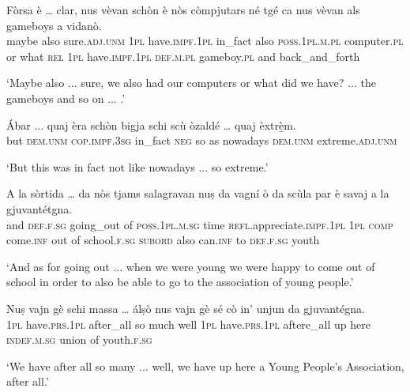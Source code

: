 \begin{linenumbers}
	\gll Fòrsa è … clar, nus vèvan schòn è nòs còmpjutars né tgé ca nus vèvan als gameboys a vidanò.    \\
	maybe also {} sure.\textsc{adj.unm} \textsc{1pl} have.\textsc{impf.1pl} in\_fact also \textsc{poss.1pl.m.pl} computer.\textsc{pl} or what \textsc{rel} \textsc{1pl} have.\textsc{impf.1pl} \textsc{def.m.pl} gameboy.\textsc{pl} and back\_and\_forth \\
\end{linenumbers}
\medskip
\glt `Maybe also ... sure, we also had our computers or what did we have? ... the gameboys and so on ... .'
\medskip

\begin{linenumbers}
	\gll  Ábar ... quaj èra schòn bigja schi scù òzaldé … quaj èxtrè̱m.   \\
	but {} \textsc{dem.unm} \textsc{cop.impf.3sg} in\_fact \textsc{neg} so as nowadays {} \textsc{dem.unm} extreme.\textsc{adj.unm}\\
\end{linenumbers}
\medskip
\glt `But this was in fact not like nowadays ... so extreme.'
\medskip

\begin{linenumbers}
	\gll A la sòrtida … da nòs tjams salagravan nuṣ da vagní ò da scùla par è savaj a la gjuvantétgna.\\
	and \textsc{def.f.sg} going\_out {} of \textsc{ poss.1pl.m.sg} time \textsc{refl}.appreciate.\textsc{impf.1pl} \textsc{1pl} \textsc{comp} come.\textsc{inf} out of school.\textsc{f.sg} \textsc{subord} also can.\textsc{inf} to \textsc{def.f.sg} youth\\
\end{linenumbers}
\medskip
\glt `And as for going out ... when we were young we were happy to come out of school in order to also be able to go to the association of young people.'
\medskip

\begin{linenumbers}
	\gll Nuṣ vajn gè schi massa … álṣò nus vajn gè sé cò in’ unjun da gjuvantégna. \\
\textsc{1pl} have.\textsc{prs.1pl} after\_all so much {} well \textsc{1pl} have.\textsc{prs.1pl} aftere\_all up here \textsc{indef.m.sg} union of youth.\textsc{f.sg}	\\
\end{linenumbers}
\medskip
\glt `We have after all so many ... well, we have up here a Young People's Association, after all.'
\medskip



